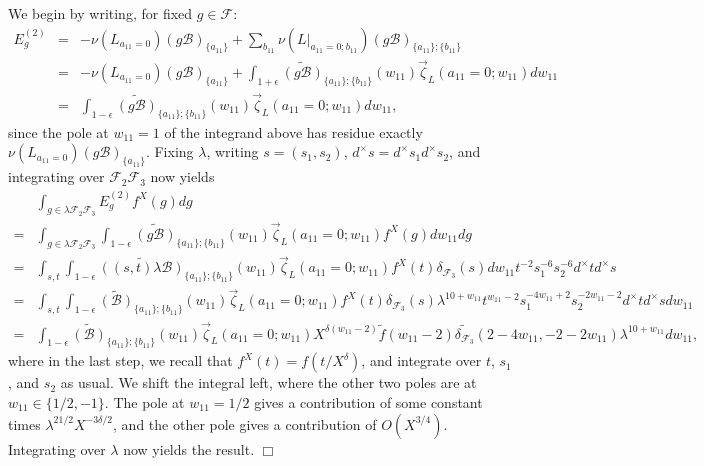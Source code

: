 \documentclass{article}
\def\cB{{\mathcal B}}
\def\FF{{\mathcal F}}
\def\wt{\widetilde}
\newenvironment{proof}{\noindent {\bf Proof:}}{$\Box$ \vspace{2 ex}}
\begin{document}
\begin{proof}
We begin by writing, for fixed $g\in\FF$:
\begin{equation*}
\begin{array}{rcl}
E_g^{(2)}&=&\displaystyle
-\nu(L_{a_{11}=0})(g\cB)_{\{a_{11}\}}
+\sum_{b_{11}}\nu(L|_{a_{11}=0;b_{11}})(g\cB)_{\{a_{11}\};\{b_{11}\}}
\\[.15in]&=&\displaystyle
-\nu(L_{a_{11}=0})(g\cB)_{\{a_{11}\}}+\int_{1+\epsilon}\wt{(g\cB)}_{\{a_{11}\};\{b_{11}\}}(w_{11})\vec\zeta_L(a_{11}=0;w_{11})dw_{11}
\\[.15in]&=&\displaystyle
\int_{1-\epsilon}\wt{(g\cB)}_{\{a_{11}\};\{b_{11}\}}(w_{11})\vec\zeta_L(a_{11}=0;w_{11})dw_{11},
\end{array}
\end{equation*}
since the pole at $w_{11}=1$ of the integrand above has residue exactly $\nu(L_{a_{11}=0})(g\cB)_{\{a_{11}\}}$.
Fixing $\lambda$, writing $s=(s_1,s_2)$, $d^\times s=d^\times s_1 d^\times s_2$, and integrating over $\FF_2\FF_3$ now yields
\begin{equation*}
\begin{array}{cl}
&\!\!\displaystyle
\int_{g\in\lambda\FF_2\FF_3}E_g^{(2)}f^X(g)dg
\\[.2in]=&\!\!
\displaystyle
\int_{g\in\lambda\FF_2\FF_3}
\int_{1-\epsilon}\wt{(g\cB)}_{\{a_{11}\};\{b_{11}\}}(w_{11})\vec\zeta_L(a_{11}=0;w_{11})f^X(g)dw_{11}dg
\\[.2in]=&\!\!\displaystyle
\int_{s,t}\int_{1-\epsilon}\wt{((s,t)\lambda\cB)}_{\{a_{11}\};\{b_{11}\}}(w_{11})\vec\zeta_L(a_{11}=0;w_{11})f^X(t)\delta_{\FF_3}(s)dw_{11}{t^{-2}s_1^{-6}s_2^{-6}}d^\times td^\times s
\\[.2in]=&\!\!\displaystyle
\int_{s,t}\int_{1-\epsilon}\wt{(\cB)}_{\{a_{11}\};\{b_{11}\}}(w_{11})\vec\zeta_L(a_{11}=0;w_{11})f^X(t)\delta_{\FF_3}(s)\lambda^{10+w_{11}}{t^{w_{11}-2}s_1^{-4w_{11}+2}s_2^{-2w_{11}-2}}d^\times td^\times s dw_{11}
\\[.2in]=&\!\!\displaystyle
\int_{1-\epsilon}\wt{(\cB)}_{\{a_{11}\};\{b_{11}\}}(w_{11})\vec\zeta_L(a_{11}=0;w_{11})X^{\delta(w_{11}-2)}\wt{f}(w_{11}-2)\wt{\delta_{\FF_3}}(2-4w_{11},-2-2w_{11})\lambda^{10+w_{11}}dw_{11},
\end{array}
\end{equation*}
where in the last step, we recall that $f^X(t)=f(t/X^\delta)$, and integrate over $t$, $s_1$, and $s_2$ as usual. We shift the integral left, where the other two poles are at $w_{11}\in\{1/2,-1\}$. The pole at $w_{11}=1/2$ gives a contribution of some constant times $\lambda^{21/2}X^{-3\delta/2}$, and the other pole gives a contribution of $O(X^{3/4})$. Integrating over $\lambda$ now yields the result.
\end{proof}
\end{document}
